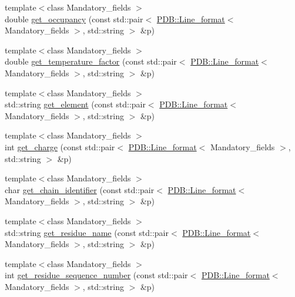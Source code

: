 \begin{DoxyCompactItemize}
\item 
{\footnotesize template$<$class Mandatory\+\_\+fields $>$ }\\double \hyperlink{namespaceESBTL_aea3b01d579054dd4c75f078490edf83a}{get\+\_\+occupancy} (const std\+::pair$<$ \hyperlink{classESBTL_1_1PDB_1_1Line__format}{P\+D\+B\+::\+Line\+\_\+format}$<$ Mandatory\+\_\+fields $>$, std\+::string $>$ \&p)
\item 
{\footnotesize template$<$class Mandatory\+\_\+fields $>$ }\\double \hyperlink{namespaceESBTL_ac26fec32ea44a63b9c1ad903e89a7170}{get\+\_\+temperature\+\_\+factor} (const std\+::pair$<$ \hyperlink{classESBTL_1_1PDB_1_1Line__format}{P\+D\+B\+::\+Line\+\_\+format}$<$ Mandatory\+\_\+fields $>$, std\+::string $>$ \&p)
\item 
{\footnotesize template$<$class Mandatory\+\_\+fields $>$ }\\std\+::string \hyperlink{namespaceESBTL_a50774331db3eb6b6ce62ee0220dc594e}{get\+\_\+element} (const std\+::pair$<$ \hyperlink{classESBTL_1_1PDB_1_1Line__format}{P\+D\+B\+::\+Line\+\_\+format}$<$ Mandatory\+\_\+fields $>$, std\+::string $>$ \&p)
\item 
{\footnotesize template$<$class Mandatory\+\_\+fields $>$ }\\int \hyperlink{namespaceESBTL_acd2d14233ae6e445cc9eb8218eae82c7}{get\+\_\+charge} (const std\+::pair$<$ \hyperlink{classESBTL_1_1PDB_1_1Line__format}{P\+D\+B\+::\+Line\+\_\+format}$<$ Mandatory\+\_\+fields $>$, std\+::string $>$ \&p)
\item 
{\footnotesize template$<$class Mandatory\+\_\+fields $>$ }\\char \hyperlink{namespaceESBTL_a94368fc997ab29fda045681aec4e6371}{get\+\_\+chain\+\_\+identifier} (const std\+::pair$<$ \hyperlink{classESBTL_1_1PDB_1_1Line__format}{P\+D\+B\+::\+Line\+\_\+format}$<$ Mandatory\+\_\+fields $>$, std\+::string $>$ \&p)
\item 
{\footnotesize template$<$class Mandatory\+\_\+fields $>$ }\\std\+::string \hyperlink{namespaceESBTL_af35913d484a7d9a9a96d0c74298f1a34}{get\+\_\+residue\+\_\+name} (const std\+::pair$<$ \hyperlink{classESBTL_1_1PDB_1_1Line__format}{P\+D\+B\+::\+Line\+\_\+format}$<$ Mandatory\+\_\+fields $>$, std\+::string $>$ \&p)
\item 
{\footnotesize template$<$class Mandatory\+\_\+fields $>$ }\\int \hyperlink{namespaceESBTL_a2ead965afb4bf4e8c180fe902eae01af}{get\+\_\+residue\+\_\+sequence\+\_\+number} (const std\+::pair$<$ \hyperlink{classESBTL_1_1PDB_1_1Line__format}{P\+D\+B\+::\+Line\+\_\+format}$<$ Mandatory\+\_\+fields $>$, std\+::string $>$ \&p)

\end{DoxyCompactItemize}
